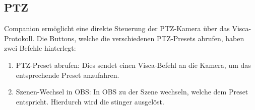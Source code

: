 		\subsection{PTZ}
			Companion ermöglicht eine direkte Steuerung der \Gls{PTZ-Kamera} über das \Gls{Visca}-Protokoll.
			Die Buttons, welche die verschiedenen PTZ-Presets abrufen, haben zwei Befehle hinterlegt:
			\begin{enumerate}
				\item PTZ-Preset abrufen: Dies sendet einen \Gls{Visca}-Befehl an die Kamera, um das entsprechende Preset anzufahren.
				\item Szenen-Wechsel in \Gls{OBS}: In \Gls{OBS} zu der Szene wechseln, welche dem Preset entspricht.
				Hierdurch wird die \Gls{stinger} ausgelöst.
			\end{enumerate}